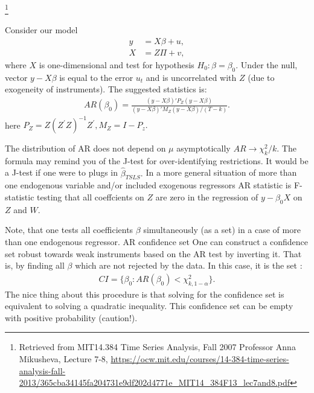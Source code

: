 \begin{remark}\footnote{Retrieved from MIT14.384 Time Series Analysis, Fall 2007
    Professor Anna Mikusheva, Lecture 7-8, \url{https://ocw.mit.edu/courses/14-384-time-series-analysis-fall-2013/365cba34145fa204731e9df202d4771e_MIT14_384F13_lec7and8.pdf}}
    \
    
    Consider our model
    \begin{align*}
        y&=X\beta+u,\\
        X&=Z\Pi+v,
    \end{align*}
    where $X$ is one-dimensional and test for hypothesis $H_0:\beta=\beta_0.$ Under the null, vector $y-X\beta$ is equal to
    the error $u_t$ and is uncorrelated with $Z$ (due to exogeneity of instruments). 
    The suggested statistics is:
    \begin{gather*}
        AR(\beta_0)=\frac{(y-X\beta)'P_Z(y-X\beta)}{(y-X\beta)'M_Z(y-X\beta)/(T-k)}.
    \end{gather*}
    here $P_Z=Z(Z^{\prime}Z)^{-1}Z^{\prime}, M_Z=I-P_z.$
    
    The distribution of AR does not depend on $\mu$ asymptotically $AR\to\chi_k^2/k.$ The formula may remind you of the J-test for over-identifying restrictions. It would be a J-test if one were to plugs in $\hat{\beta}_{TSLS}.$
    In a more general situation of more than one endogenous variable and/or included exogenous regressors AR statistic is F-statistic testing 
    that all coeffcients on $Z$ are zero in the regression of $y-\beta_0X$ on $Z$ and $W$.
    
    Note, that one tests all coefficients $\beta$ simultaneously (as a set) in a case of more than one endogenous regressor.
    AR confidence set One can construct a confidence set robust towards weak instruments based on the AR test by inverting it. 
    That is, by finding all $\beta$ which are not rejected by the data. In this case, it is the set :
    \begin{gather*}
        CI =\{ \beta_0:AR(\beta_0)<\chi_{k,1-\alpha}^2 \}.
    \end{gather*}
    The nice thing about this procedure is that solving for the confidence set is equivalent to solving a quadratic inequality. 
    This confidence set can be empty with positive probability (caution!).
\end{remark}